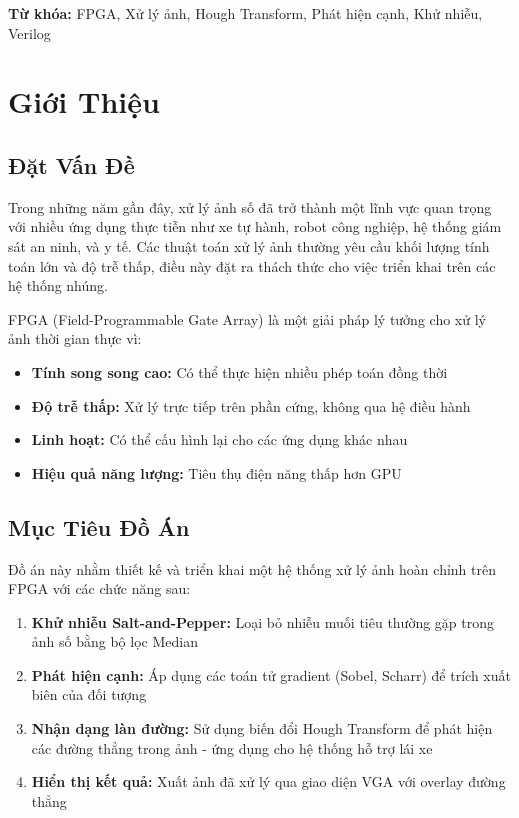 \documentclass[12pt,a4paper]{report}
\begin{document}
\textbf{Từ khóa:} FPGA, Xử lý ảnh, Hough Transform, Phát hiện cạnh, Khử nhiễu, Verilog

\tableofcontents
\listoffigures
\listoftables

\chapter{Giới Thiệu}

\section{Đặt Vấn Đề}

Trong những năm gần đây, xử lý ảnh số đã trở thành một lĩnh vực quan trọng với nhiều ứng dụng thực tiễn như xe tự hành, robot công nghiệp, hệ thống giám sát an ninh, và y tế. Các thuật toán xử lý ảnh thường yêu cầu khối lượng tính toán lớn và độ trễ thấp, điều này đặt ra thách thức cho việc triển khai trên các hệ thống nhúng.

FPGA (Field-Programmable Gate Array) là một giải pháp lý tưởng cho xử lý ảnh thời gian thực vì:
\begin{itemize}
    \item \textbf{Tính song song cao:} Có thể thực hiện nhiều phép toán đồng thời
    \item \textbf{Độ trễ thấp:} Xử lý trực tiếp trên phần cứng, không qua hệ điều hành
    \item \textbf{Linh hoạt:} Có thể cấu hình lại cho các ứng dụng khác nhau
    \item \textbf{Hiệu quả năng lượng:} Tiêu thụ điện năng thấp hơn GPU
\end{itemize}

\section{Mục Tiêu Đồ Án}

Đồ án này nhằm thiết kế và triển khai một hệ thống xử lý ảnh hoàn chỉnh trên FPGA với các chức năng sau:

\begin{enumerate}
    \item \textbf{Khử nhiễu Salt-and-Pepper:} Loại bỏ nhiễu muối tiêu thường gặp trong ảnh số bằng bộ lọc Median
    
    \item \textbf{Phát hiện cạnh:} Áp dụng các toán tử gradient (Sobel, Scharr) để trích xuất biên của đối tượng
    
    \item \textbf{Nhận dạng làn đường:} Sử dụng biến đổi Hough Transform để phát hiện các đường thẳng trong ảnh - ứng dụng cho hệ thống hỗ trợ lái xe
    
    \item \textbf{Hiển thị kết quả:} Xuất ảnh đã xử lý qua giao diện VGA với overlay đường thẳng
\end{enumerate}
\end{document}
